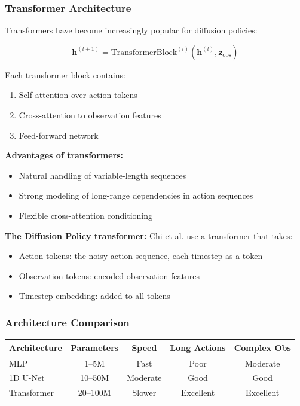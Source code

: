 \subsubsection{Transformer Architecture}

Transformers have become increasingly popular for diffusion policies:

\begin{equation}
\mathbf{h}^{(l+1)} = \text{TransformerBlock}^{(l)}(\mathbf{h}^{(l)}, \mathbf{z}_{\text{obs}})
\label{eq:transformer_block}
\end{equation}

Each transformer block contains:
\begin{enumerate}
    \item Self-attention over action tokens
    \item Cross-attention to observation features
    \item Feed-forward network
\end{enumerate}

\textbf{Advantages of transformers:}
\begin{itemize}
    \item Natural handling of variable-length sequences
    \item Strong modeling of long-range dependencies in action sequences
    \item Flexible cross-attention conditioning
\end{itemize}

\textbf{The Diffusion Policy transformer:} Chi et al. use a transformer that takes:
\begin{itemize}
    \item Action tokens: the noisy action sequence, each timestep as a token
    \item Observation tokens: encoded observation features
    \item Timestep embedding: added to all tokens
\end{itemize}

\subsubsection{Architecture Comparison}

\begin{center}
\begin{tabular}{lcccc}
\toprule
\textbf{Architecture} & \textbf{Parameters} & \textbf{Speed} & \textbf{Long Actions} & \textbf{Complex Obs} \\
\midrule
MLP & 1--5M & Fast & Poor & Moderate \\
1D U-Net & 10--50M & Moderate & Good & Good \\
Transformer & 20--100M & Slower & Excellent & Excellent \\
\bottomrule
\end{tabular}
\end{center}

